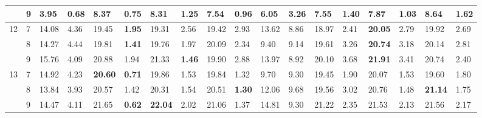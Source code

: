\documentclass[conference]{IEEEtran}
\begin{document}
\begin{table*}[]
\begin{tabular}{|cl|ll|ll|ll|ll|ll|ll|ll|ll|}
		\multicolumn{1}{|c|}{} & 9 & \multicolumn{1}{l|}{3.95} & \textbf{0.68} & \multicolumn{1}{l|}{8.37} & 0.75 & \multicolumn{1}{l|}{8.31} & 1.25 & \multicolumn{1}{l|}{7.54} & 0.96 & \multicolumn{1}{l|}{6.05} & 3.26 & \multicolumn{1}{l|}{7.55} & 1.40 & \multicolumn{1}{l|}{7.87} & 1.03 & \multicolumn{1}{l|}{\textbf{8.64}} & 1.62 \\ \hline
		\multicolumn{1}{|c|}{\multirow{3}{*}{12}} & 7 & \multicolumn{1}{l|}{14.08} & 4.36 & \multicolumn{1}{l|}{19.45} & \textbf{1.95} & \multicolumn{1}{l|}{19.31} & 2.56 & \multicolumn{1}{l|}{19.42} & 2.93 & \multicolumn{1}{l|}{13.62} & 8.86 & \multicolumn{1}{l|}{18.97} & 2.41 & \multicolumn{1}{l|}{\textbf{20.05}} & 2.79 & \multicolumn{1}{l|}{19.92} & 2.69 \\ \cline{2-18} 
		\multicolumn{1}{|c|}{} & 8 & \multicolumn{1}{l|}{14.27} & 4.44 & \multicolumn{1}{l|}{19.81} & \textbf{1.41} & \multicolumn{1}{l|}{19.76} & 1.97 & \multicolumn{1}{l|}{20.09} & 2.34 & \multicolumn{1}{l|}{9.40} & 9.14 & \multicolumn{1}{l|}{19.61} & 3.26 & \multicolumn{1}{l|}{\textbf{20.74}} & 3.18 & \multicolumn{1}{l|}{20.14} & 2.81 \\ \cline{2-18} 
		\multicolumn{1}{|c|}{} & 9 & \multicolumn{1}{l|}{15.76} & 4.09 & \multicolumn{1}{l|}{20.88} & 1.94 & \multicolumn{1}{l|}{21.33} & \textbf{1.46} & \multicolumn{1}{l|}{19.90} & 2.88 & \multicolumn{1}{l|}{13.97} & 8.92 & \multicolumn{1}{l|}{20.10} & 3.68 & \multicolumn{1}{l|}{\textbf{21.91}} & 3.41 & \multicolumn{1}{l|}{20.74} & 2.40 \\ \hline
		\multicolumn{1}{|c|}{\multirow{3}{*}{13}} & 7 & \multicolumn{1}{l|}{14.92} & 4.23 & \multicolumn{1}{l|}{\textbf{20.60}} & \textbf{0.71} & \multicolumn{1}{l|}{19.86} & 1.53 & \multicolumn{1}{l|}{19.84} & 1.32 & \multicolumn{1}{l|}{9.70} & 9.30 & \multicolumn{1}{l|}{19.45} & 1.90 & \multicolumn{1}{l|}{20.07} & 1.53 & \multicolumn{1}{l|}{19.60} & 1.80 \\ \cline{2-18} 
		\multicolumn{1}{|c|}{} & 8 & \multicolumn{1}{l|}{13.84} & 3.93 & \multicolumn{1}{l|}{20.57} & 1.42 & \multicolumn{1}{l|}{20.31} & 1.54 & \multicolumn{1}{l|}{20.51} & \textbf{1.30} & \multicolumn{1}{l|}{12.06} & 9.68 & \multicolumn{1}{l|}{19.56} & 3.02 & \multicolumn{1}{l|}{20.76} & 1.48 & \multicolumn{1}{l|}{\textbf{21.14}} & 1.75 \\ \cline{2-18} 
		\multicolumn{1}{|c|}{} & 9 & \multicolumn{1}{l|}{14.47} & 4.11 & \multicolumn{1}{l|}{21.65} & \textbf{0.62} & \multicolumn{1}{l|}{\textbf{22.04}} & 2.02 & \multicolumn{1}{l|}{21.06} & 1.37 & \multicolumn{1}{l|}{14.81} & 9.30 & \multicolumn{1}{l|}{21.22} & 2.35 & \multicolumn{1}{l|}{21.53} & 2.13 & \multicolumn{1}{l|}{21.56} & 2.17 \\ \hline

\end{tabular}
\end{table*}
\end{document}
